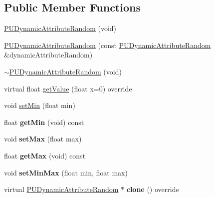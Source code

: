 \subsection*{Public Member Functions}
\begin{DoxyCompactItemize}
\item 
\hyperlink{classPUDynamicAttributeRandom_aa9330b573f4e1f1a042f4e644996a6cd}{P\+U\+Dynamic\+Attribute\+Random} (void)
\item 
\hyperlink{classPUDynamicAttributeRandom_a1e1372992de014c69753fc2ab26adb2c}{P\+U\+Dynamic\+Attribute\+Random} (const \hyperlink{classPUDynamicAttributeRandom}{P\+U\+Dynamic\+Attribute\+Random} \&dynamic\+Attribute\+Random)
\item 
\hyperlink{classPUDynamicAttributeRandom_a438343056409091b7304d9983f4d62cf}{$\sim$\+P\+U\+Dynamic\+Attribute\+Random} (void)
\item 
virtual float \hyperlink{classPUDynamicAttributeRandom_a40ef3a16e08b112a9130c8d5e8f76d78}{get\+Value} (float x=0) override
\item 
void \hyperlink{classPUDynamicAttributeRandom_a01a86b476cd6053523fccdedc7605519}{set\+Min} (float min)
\item 
\mbox{\label{classPUDynamicAttributeRandom_ad64cb7964c9724b6d914397a0ad89990}} 
float {\bfseries get\+Min} (void) const
\item 
\mbox{\label{classPUDynamicAttributeRandom_a92d9ce3f8a864c9c81c51f3f85d5f833}} 
void {\bfseries set\+Max} (float max)
\item 
\mbox{\label{classPUDynamicAttributeRandom_a8c2f70bd354095f438fba905d289570c}} 
float {\bfseries get\+Max} (void) const
\item 
\mbox{\label{classPUDynamicAttributeRandom_aee94887bbb2af2b9cd7cd7cb44e510ca}} 
void {\bfseries set\+Min\+Max} (float min, float max)
\item 
\mbox{\label{classPUDynamicAttributeRandom_a98b00269f17bcced6e80e61ae6d9f81a}} 
virtual \hyperlink{classPUDynamicAttributeRandom}{P\+U\+Dynamic\+Attribute\+Random} $\ast$ {\bfseries clone} () override
\item 
\mbox{\label{classPUDynamicAttributeRandom_a0655512be802affc75a8c1a3c5a061da}} 

\end{DoxyCompactItemize}
